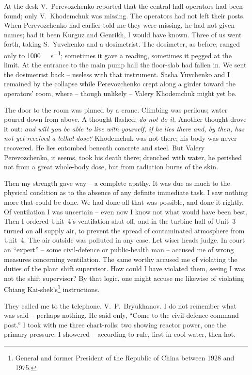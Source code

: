 \documentclass[openright]{bookest}
\begin{document}

At the desk V.~Perevozchenko reported that the central-hall operators had been found; only V.~Khodemchuk was missing. The operators had not left their posts. When Perevozchenko had earlier told me they were missing, he had not given names; had it been Kurguz and Genrikh, I would have known. Three of us went forth, taking S.~Yuvchenko and a dosimetrist. The dosimeter, as before, ranged only to \qty{1000}{\micro\roentgen\per\second}; sometimes it gave a reading, sometimes it pegged at the limit. At the entrance to the main pump hall the floor-slab had fallen in. We sent the dosimetrist back -- useless with that instrument. Sasha Yuvchenko and I remained by the collapse while Perevozchenko crept along a girder toward the operators' room, where -- though unlikely -- Valery Khodemchuk might yet be.

The door to the room was pinned by a crane. Climbing was perilous; water poured down from above. A thought flashed: \textit{do not do it}. Another thought drove it out: \textit{and will you be able to live with yourself, if he lies there and, by then, has not yet received a lethal dose?} Khodemchuk was not there; his body was never recovered. He lies entombed beneath concrete and steel. But Valery Perevozchenko, it seems, took his death there; drenched with water, he perished not from a great whole-body dose, but from radiation burns of the skin.

Then my strength gave way -- a complete apathy. It was due as much to the physical condition as to the absence of any definite immediate task. I saw nothing more that could be done. We had done all that was possible, and done it rightly. Of ventilation I was uncertain -- even now I know not what would have been best. Then I ordered Unit~4's ventilation shut off, and in the turbine hall of Unit~3 turned on all supply air, to prevent the spread of contaminated atmosphere from Unit~4. The air outside was polluted in any case. Let wiser heads judge. In court an ``expert'' -- some civil-defence or public-health man -- accused me of wrong measures concerning ventilation. The same worthy accused me of violating the duties of the plant shift supervisor. How could I have violated them, seeing I was not the shift supervisor? By that logic, one might accuse me likewise of violating Chiang Kai-shek's\footnote{General and former President of the Republic of China between 1928 and 1975.} instructions.

They called me to the telephone. V.~P.~Bryukhanov. I do not remember what was said -- perhaps nothing. He said only, ``Come to the civil-defence command post.'' I took with me three chart-rolls: two showing reactor power, one the primary pressure. I showered -- according to rule, first in cool water, then hot.
\end{document}
